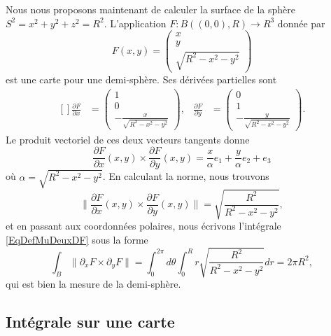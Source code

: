 Nous nous proposons maintenant de calculer la surface de la sphère $S^2=x^2+y^2+z^2=R^2$. L'application $F\colon B( (0,0),R)\to R^3$ donnée par
\begin{equation}
	F(x,y)=\begin{pmatrix}
		x	\\
		y	\\
		\sqrt{R^2-x^2-y^2}
	\end{pmatrix}
\end{equation}
est une carte pour une demi-sphère. Ses dérivées partielles sont
\begin{equation}
	\begin{aligned}[]
		\frac{ \partial F }{ \partial x }&=\begin{pmatrix}
			1	\\
			0	\\
			-\frac{ x }{ \sqrt{R^2-x^2-y^2} }
		\end{pmatrix},
		&\frac{ \partial F }{ \partial y }&=\begin{pmatrix}
			0	\\
			1	\\
			-\frac{ y }{ \sqrt{R^2-x^2-y^2} }
		\end{pmatrix}.
	\end{aligned}
\end{equation}
Le produit vectoriel de ces deux vecteurs tangents donne
\begin{equation}
	\frac{ \partial F }{ \partial x }(x,y)\times\frac{ \partial F }{ \partial y }(x,y)=\frac{ x }{ \alpha }e_1+\frac{ y }{ \alpha }e_2+e_3
\end{equation}
où $\alpha=\sqrt{R^2-x^2-y^2}$. En calculant la norme, nous trouvons
\begin{equation}
	\| \frac{ \partial F }{ \partial x }(x,y)\times\frac{ \partial F }{ \partial y }(x,y)\| =\sqrt{  \frac{ R^2 }{ R^2-x^2-y^2 } },
\end{equation}
et en passant aux coordonnées polaires, nous écrivons l'intégrale \eqref{EqDefMuDeuxDF} sous la forme
\begin{equation}
	\int_B\| \partial_xF\times\partial_yF \|=\int_0^{2\pi}d\theta\int_0^R r\sqrt{  \frac{ R^2 }{ R^2-x^2-y^2 } }dr=2\pi R^2,
\end{equation}
qui est bien la mesure de la demi-sphère.

\subsection{Intégrale sur une carte}

